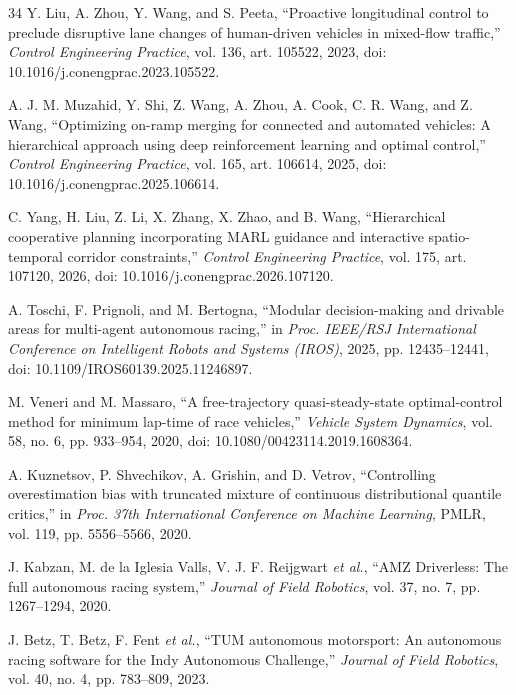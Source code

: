 \documentclass[journal,twoside,web]{ieeecolor}
\begin{document}
\begin{thebibliography}{34}
Y. Liu, A. Zhou, Y. Wang, and S. Peeta,
``Proactive longitudinal control to preclude disruptive lane changes of
human-driven vehicles in mixed-flow traffic,''
\emph{Control Engineering Practice}, vol. 136, art. 105522, 2023,
doi: 10.1016/j.conengprac.2023.105522.

A. J. M. Muzahid, Y. Shi, Z. Wang, A. Zhou, A. Cook, C. R. Wang, and Z. Wang,
``Optimizing on-ramp merging for connected and automated vehicles: A
hierarchical approach using deep reinforcement learning and optimal control,''
\emph{Control Engineering Practice}, vol. 165, art. 106614, 2025,
doi: 10.1016/j.conengprac.2025.106614.

C. Yang, H. Liu, Z. Li, X. Zhang, X. Zhao, and B. Wang,
``Hierarchical cooperative planning incorporating MARL guidance and
interactive spatio-temporal corridor constraints,''
\emph{Control Engineering Practice}, vol. 175, art. 107120, 2026,
doi: 10.1016/j.conengprac.2026.107120.

A. Toschi, F. Prignoli, and M. Bertogna,
``Modular decision-making and drivable areas for multi-agent autonomous
racing,'' in \emph{Proc. IEEE/RSJ International Conference on Intelligent
Robots and Systems (IROS)}, 2025, pp. 12435--12441,
doi: 10.1109/IROS60139.2025.11246897.

M. Veneri and M. Massaro,
``A free-trajectory quasi-steady-state optimal-control method for minimum
lap-time of race vehicles,''
\emph{Vehicle System Dynamics}, vol. 58, no. 6, pp. 933--954, 2020,
doi: 10.1080/00423114.2019.1608364.

A. Kuznetsov, P. Shvechikov, A. Grishin, and D. Vetrov,
``Controlling overestimation bias with truncated mixture of continuous
distributional quantile critics,'' in \emph{Proc. 37th International
Conference on Machine Learning}, PMLR, vol. 119, pp. 5556--5566, 2020.

J. Kabzan, M. de la Iglesia Valls, V. J. F. Reijgwart \emph{et al.},
``AMZ Driverless: The full autonomous racing system,''
\emph{Journal of Field Robotics}, vol. 37, no. 7, pp. 1267--1294, 2020.

J. Betz, T. Betz, F. Fent \emph{et al.},
``TUM autonomous motorsport: An autonomous racing software for the Indy
Autonomous Challenge,'' \emph{Journal of Field Robotics}, vol. 40, no. 4,
pp. 783--809, 2023.

\end{thebibliography}
\end{document}

